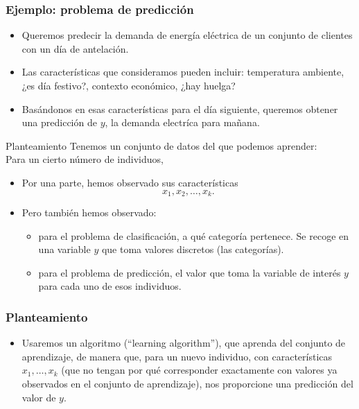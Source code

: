 \documentclass[aspectratio=169]{beamer}
\begin{document}
\begin{frame}\frametitle{Ejemplo: problema de predicción}
 \begin{itemize}
  \item<+-> Queremos predecir la demanda de energía eléctrica de un conjunto de clientes con un día de antelación.
  \item<+-> Las características que consideramos pueden incluir: temperatura ambiente, ¿es día festivo?, contexto económico, ¿hay huelga?  
\item<+-> Basándonos en esas características para el día siguiente, queremos obtener una predicción de $y$, la demanda electríca para mañana.
  \end{itemize}
 \end{frame}

 \begin{frame}{Planteamiento}
Tenemos un conjunto de datos del que podemos aprender:\\
Para un cierto número de individuos,
\begin{itemize}
\item Por una parte, hemos observado sus características $$x_1,x_2,\ldots, x_k.$$
\item<3-> Pero también hemos observado:
  \begin{itemize}
  \item<4->   para el problema de clasificación, a qué categoría pertenece. Se recoge en una variable $y$ que toma valores discretos (las categorías). 
  \item<5-> para el problema de predicción, el valor que toma la variable de interés $y$ para cada uno de esos individuos.
  \end{itemize}
\end{itemize}
\begin{center}
  \fbox{\textcolor{red}{``Learning set''}}
\end{center}
 \end{frame}
 \begin{frame}\frametitle{Planteamiento}
   \begin{itemize}
   \item Usaremos un algoritmo  (``learning algorithm''), que aprenda del conjunto de aprendizaje, de manera que, para un nuevo individuo, con características $x_1,\ldots,x_k$ (que no tengan por qué corresponder exactamente con valores ya observados en el conjunto de aprendizaje), nos proporcione una predicción del valor de $y$.
   \end{itemize}
   
 \end{frame}
\end{document}
